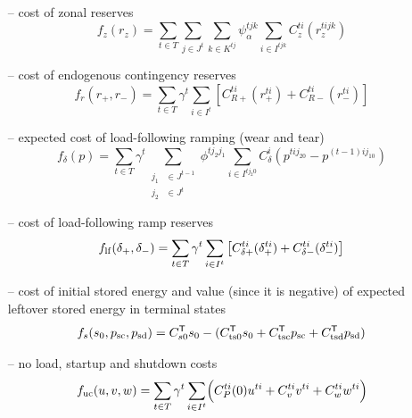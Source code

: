 \documentclass[12pt]{article}
\newcommand{\trans}[1]{#1^{\ensuremath{\mathsf{T}}}}    %
\numberwithin{equation}{section}
\numberwithin{table}{section}
\numberwithin{figure}{section}
\begin{document}
\begin{itemize}
\item[--] cost of zonal reserves\footnotemark[\value{footnote}]
\begin{equation}
f_z(r_z) = \sum_{t\in T} \sum_{j\in J^t} \sum_{k\in K^{tj}} \psi_\alpha^{tjk} \sum_{i\in I^{tjk}} C_z^{ti}(r_z^{tijk})
\label{eq:most_zres_cost}
\end{equation}
\item[--] cost of endogenous contingency reserves\footnotemark[\value{footnote}]
\begin{equation}
f_r(r_+, r_-) = \sum_{t\in T}  \gamma^t  \sum_{i\in I^t} \left[C_{R+}^{ti}(r_+^{ti}) + C_{R-}^{ti}(r_-^{ti}) \right]
\label{eq:most_cres_cost}
\end{equation}
\item[--] expected cost of load-following ramping (wear and tear)
\begin{equation}
f_\delta(p) = \sum_{t\in T} \! \gamma^t \!\!\!\!\! \sum_{\begin{aligned}\scriptstyle j_1 &\scriptstyle \in J^{t-1}\\[-6pt] \scriptstyle j_2 &\scriptstyle \in J^t\end{aligned}} \!\!\!\!\!
        \phi^{t j_2 j_1} \!\!\!\! \sum_{i\in I^{tj_2 0}} \!\!\! C_\delta^i(p^{tij_20} - p^{(t-1)ij_10})
\label{eq:rampcost}
\end{equation}
\item[--] cost of load-following ramp reserves
\begin{equation}
f_{\rm lf}(\delta_+, \delta_-) = \sum_{t\in T}  \gamma^t  \sum_{i\in I^t} \left[C_{\delta+}^{ti}(\delta_+^{ti}) + C_{\delta-}^{ti}(\delta_-^{ti}) \right]
\label{eq:most_rampres_cost}
\end{equation}
\item[--] cost of initial stored energy and value (since it is negative) of expected leftover stored energy in terminal states
\begin{equation}
f_s(s_0, p_{\rm sc}, p_{\rm sd}) = \trans{C_{s0}} s_0 - (\trans{C_{\rm ts0}} s_0 + \trans{C_{\rm tsc}} p_{\rm sc} + \trans{C_{\rm tsd}} p_{\rm sd}) \label{eq:storagecost}
\end{equation}
\item[--] no load, startup and shutdown costs
\begin{equation}
f_{\rm uc}(u,v,w) = \sum_{t\in T} \gamma^t \sum_{i\in I^t} \Bigl( C_P^{ti}(0) u^{ti} + C_v^{ti} v^{ti} +  C_w^{ti} w^{ti} \Bigr)
\end{equation}
\end{itemize}
\end{document}

